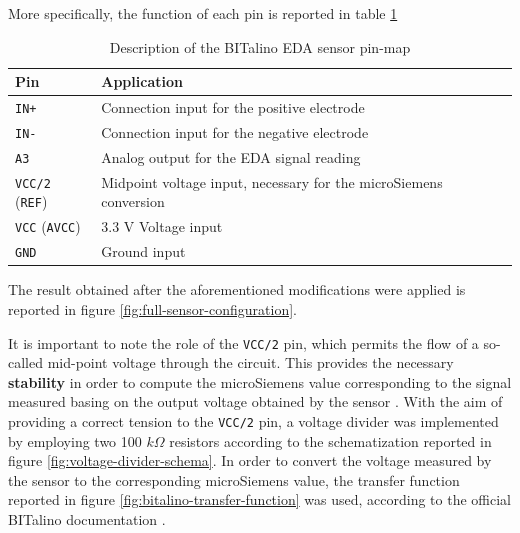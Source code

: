 More specifically, the function of each pin is reported in table \ref{toc:bitalino-pinmap-table}

\begin{table}[H]
\centering
\begin{tabular}{ll}
    \hline
    \textbf{Pin}                    & \textbf{Application} \\
    \hline
    \texttt{IN+}                    & Connection input for the positive electrode \\
    \texttt{IN-}                    & Connection input for the negative electrode \\
    \texttt{A3}                     & Analog output for the EDA signal reading \\
    \texttt{VCC/2} (\texttt{REF})   & Midpoint voltage input, necessary for the microSiemens conversion \\
    \texttt{VCC} (\texttt{AVCC})    & 3.3 V Voltage input \\
    \texttt{GND}                    & Ground input \\
    \hline
\end{tabular}
\caption{Description of the BITalino EDA sensor pin-map}
\label{toc:bitalino-pinmap-table}
\end{table}

\vspace{1cm}

The result obtained after the aforementioned modifications were applied is reported in figure \ref{fig:full-sensor-configuration}. 

It is important to note the role of the \texttt{VCC/2} pin, which permits the flow of a so-called mid-point voltage through the circuit. This provides the necessary \textbf{stability} in order to compute the microSiemens value corresponding to the signal measured basing on the output voltage obtained by the sensor \cite{bitalino-midpoint-voltage}. With the aim of providing a correct tension to the \texttt{VCC/2} pin, a voltage divider was implemented by employing two 100 $k\Omega$ resistors according to the schematization reported in figure \ref{fig:voltage-divider-schema}. In order to convert the voltage measured by the sensor to the corresponding microSiemens value, the transfer function reported in figure \ref{fig:bitalino-transfer-function} was used, according to the official BITalino documentation \cite{bitalino-general}.

